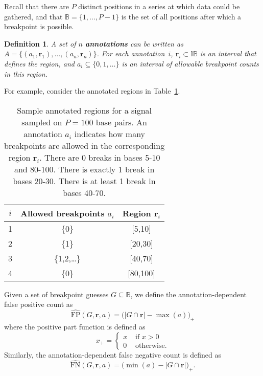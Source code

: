\documentclass{jsfds} %
\newtheorem{definition}{Definition}
\renewcommand{\r}{ \mathbf{ r} }
\begin{document}

Recall that there are $P$ distinct positions in a series at which data
could be gathered, 
and that $\mathbb B=\{1,\dots,P-1\}$ is the set of all
positions after which a breakpoint is possible.

\begin{definition}
  A set of $n$ \textbf{annotations} can be written as $A=\{(a_1,
  \r_1), \dots, (a_n, \r_n)\}$. For each annotation~$i$,
  $\r_i\subset\mathbb I\mathbb B$ is an interval that defines the
  region, and $a_i\subseteq\{0,1,\dots\}$ is an interval of allowable
  breakpoint counts in this region.
\end{definition}

For
example, consider the annotated regions in
Table~\ref{tab:sample_annotations}.

\begin{table}[H]
  \begin{center}
    \begin{tabular}{ccc}
  $i$ & Allowed breakpoints $a_i$ & Region $\r_i$\\
\hline
1 & \{0\} & [5,10]\\
2 & \{1\} & [20,30]\\
3 & \{1,2,\dots\} & [40,70]\\
4 & \{0\} & [80,100]
\end{tabular}
  \end{center}
  \caption{Sample annotated regions for a signal sampled on $P=100$ base pairs. 
    An annotation $a_i$ indicates how many breakpoints are allowed in the
    corresponding region $\r_i$.
    There are 0 breaks in bases 5-10 and 80-100.
    There is exactly 1 break in bases 20-30.
    There is at least 1 break in bases 40-70.}
  \label{tab:sample_annotations}
\end{table}

Given a set of breakpoint guesses $G\subseteq \mathbb B$, we define
the annotation-dependent false positive count as
\begin{equation}
  \label{eq:FP_hat}
  \hat{ \text{FP}}(G,\r,a) =
    \big( 
|G\cap\r|-\max(a)
\big)_+
\end{equation}
where the positive part function is defined as
\begin{equation}
x_+ =
  \begin{cases}
    x & \text{ if } x > 0 \\
    0 & \text{ otherwise.}
  \end{cases}
\end{equation}
Similarly, the annotation-dependent false negative count is defined as
\begin{equation}
  \label{eq:FN_hat}
  \hat{ \text{FN}}(G,\r,a) =
  \big(
\min(a)-|G\cap\r|
\big)_+.
\end{equation}
\end{document}
